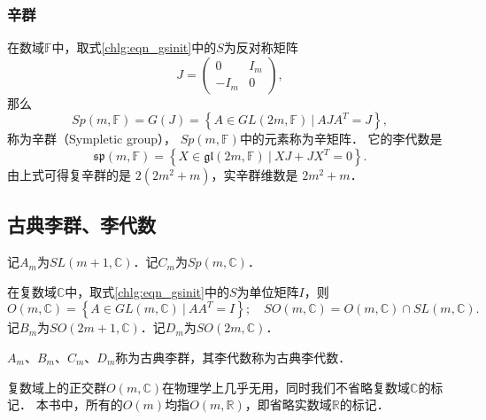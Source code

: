 \subsubsection{辛群}
在数域$\mathbb{F}$中，取式\eqref{chlg:eqn_gsinit}中的$S$为反对称矩阵
\begin{equation}
    J = \begin{pmatrix}
            0 & I_m \\ -I_m & 0
        \end{pmatrix},
\end{equation}
那么
\begin{equation}
    Sp(m,\mathbb{F})=G(J)= \left\{ A \in GL(2m,\mathbb{F})\ |\ A J {A}^T =J \right\},
\end{equation}
称为{\heiti 辛群}（Sympletic group），
$Sp(m,\mathbb{F})$中的元素称为{\heiti 辛矩阵}．
它的李代数是
\begin{equation}
    \mathfrak{sp}(m,\mathbb{F})= \left\{ X \in 
    \mathfrak{gl}(2m,\mathbb{F})\ |\ X J + J {X}^T =0 \right\}.
\end{equation}
由上式可得复辛群的是 $2(2m^2+m)$，实辛群维数是 $2m^2+m$．


\subsection{古典李群、李代数}\label{chlg:sec_clg}
  

记$A_m$为$SL(m+1,\mathbb{C})$．记$C_m$为$Sp(m,\mathbb{C})$．

在复数域$\mathbb{C}$中，取式\eqref{chlg:eqn_gsinit}中的$S$为单位矩阵$I$，则
\begin{equation*}
	O(m,\mathbb{C}) = \left\{ A \in GL(m,\mathbb{C})\ |\ A A^T =I \right\};
	\quad SO(m,\mathbb{C}) = O(m,\mathbb{C}) \cap SL(m,\mathbb{C}).
\end{equation*}
记$B_m$为$SO(2m+1,\mathbb{C})$．记$D_m$为$SO(2m,\mathbb{C})$．

$A_m$、$B_m$、$C_m$、$D_m$称为{\heiti 古典李群}，其李代数称为{\heiti 古典李代数}．

复数域上的正交群$O(m,\mathbb{C})$在物理学上几乎无用，同时我们不省略复数域$\mathbb{C}$的标记．
本书中，所有的$O(m)$均指$O(m,\mathbb{R})$，即省略实数域$\mathbb{R}$的标记．


